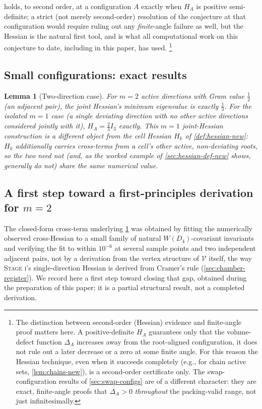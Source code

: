 \documentclass[11pt,reqno]{amsart}
\renewcommand{\_}{\origunderscore\allowbreak}
\numberwithin{equation}{section}
\theoremstyle{plain}
\newtheorem{lem}[thm]{Lemma}
\theoremstyle{definition}
\theoremstyle{remark}
\newcommand{\VCell}{\mathcal{V}}             %
\newcommand{\defect}{\Delta}                 %
\newcommand{\stageone}{\textnormal{\scshape Stage i}}
\begin{document}
 holds, to second order, at a configuration $A$
exactly when $H_A$ is positive semi-definite; a strict (not merely
second-order) resolution of the conjecture at that configuration would
require ruling out any \emph{finite}-angle failure as well, but the
Hessian is the natural first tool, and is what all computational work
on this conjecture to date, including in this paper, has used.%
\footnote{The distinction between second-order (Hessian) evidence and finite-angle proof matters here.  A positive-definite $H_A$ guarantees only
  that the volume-defect function $\defect_A$ increases away from the
  root-aligned configuration, it does not rule out a later decrease or
  a zero at some finite angle.  For this reason the Hessian technique, even
  when it succeeds completely (e.g., for chain active sets, \cref{lem:chains-new}),
  is a second-order certificate only.  The swap-configuration results of
  \cref{sec:swap-configs} are of a different character: they are exact,
  finite-angle proofs that $\Delta_A>0$ \emph{throughout} the packing-valid
  range, not just infinitesimally.}

\subsection{Small configurations: exact results}

\begin{lem}[Two-direction case]\label{lem:m2-exact-new}
For $m=2$ active directions with Gram value $\tfrac12$ (an adjacent
pair), the joint Hessian's minimum eigenvalue is exactly $\tfrac13$. For
the isolated $m=1$ case (a single deviating direction with no other
active directions considered jointly with it), $H_A=\tfrac23I_3$
exactly. This $m=1$ joint-Hessian construction is a different object
from the cell Hessian $H_k$ of \cref{def:hessian-new}: $H_k$ additionally
carries cross-terms from a cell's other active, non-deviating roots,
so the two need not (and, as the worked example of \cref{sec:hessian-def-new}
shows, generally do not) share the same numerical value.
\end{lem}

\subsection{A first step toward a first-principles derivation for \texorpdfstring{$m=2$}{m=2}}\label{sec:m2-firstprinciples-new}

The closed-form cross-term underlying \cref{lem:m2-exact-new} was obtained
by fitting the numerically observed cross-Hessian to a small family of natural
$W(D_4)$-covariant invariants and verifying the fit to within $10^{-6}$ at
several sample points and two independent adjacent pairs, not by a
derivation from the vertex structure of $\VCell$ itself, the way
\stageone's single-direction Hessian is derived from Cramer's rule
(\cref{sec:chamber-register}). We record here a first step toward closing
that gap, obtained during the preparation of this paper; it is a partial
structural result, not a completed derivation.
\end{document}
